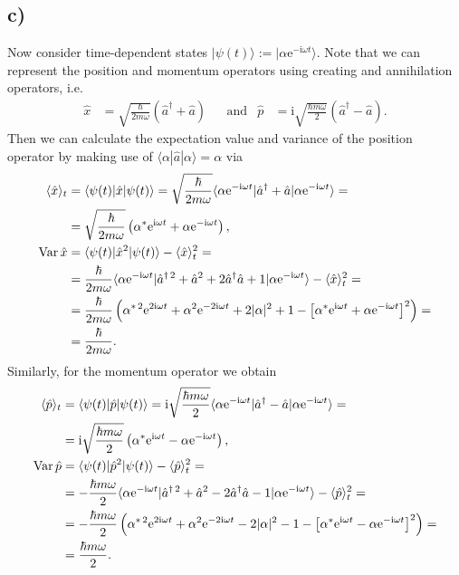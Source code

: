 \documentclass[english, parskip=full]{scrartcl}
\newcommand{\bra}{}
\newcommand{\braket}{}
\newcommand{\kla}{}
\newcommand{\klam}{}
\newcommand{\tecxt}{}
\newcommand{\Bra}{}
\newcommand{\Ket}{}
\renewcommand{\i}{\text{i}}
\newcommand{\e}{\text{e}}
\begin{document}
\subsection*{c)}
Now consider time-dependent states $\Ket | \psi(t) \rangle:=\Ket | \alpha\e^{-\i\omega t} \rangle$.
Note that we can represent the position and momentum operators using creating and annihilation operators, i.e.
\begin{align}
\hat{x} &= \sqrt{\frac{\hbar}{2m\omega}}\kla\left( \hat{a}^\dagger +\hat{a} \right)&&\tecxt\text{and}& \hat{p}&=\i\sqrt{\frac{\hbar m\omega}{2}}\kla\left( \hat{a}^\dagger -\hat{a} \right).
\end{align}
Then we can calculate the expectation value and variance of the position operator by making use of $\Bra\langle \alpha |\hat{a}\Ket | \alpha \rangle=\alpha$ via
\begin{align}
\bra\langle \hat{x} \rangle_t&=\braket\langle \psi(t) | \hat{x} | \psi(t) \rangle = \sqrt{\frac{\hbar}{2m\omega}}\braket\langle \alpha\e^{-\i\omega t} | \hat{a}^\dagger + \hat{a} | \alpha\e^{-\i\omega t} \rangle = \\
&= \sqrt{\frac{\hbar}{2m\omega}}\kla\left( \alpha^\ast\e^{\i\omega t} + \alpha\e^{-\i\omega t} \right),\\
\tecxt\text{Var\,} \hat{x} &=\braket\langle \psi(t) | \hat{x}^2 | \psi(t) \rangle - \bra\langle \hat{x} \rangle_t^2 = \\
&= \frac{\hbar}{2m\omega}\braket\langle \alpha\e^{-\i\omega t} | \hat{a}^{\dagger\,2} + \hat{a}^2 +2 \hat{a}^\dagger\hat{a} + 1 | \alpha\e^{-\i\omega t} \rangle - \bra\langle \hat{x} \rangle_t^2 =\\
&= \frac{\hbar}{2m\omega}\kla\left( \alpha^{\ast\,2}\e^{2\i\omega t} + \alpha^2\e^{-2\i\omega t} + 2|\alpha|^2+1-\klam\left[ \alpha^\ast\e^{\i\omega t} + \alpha\e^{-\i\omega t} \right]^2 \right) = \\
&=\frac{\hbar}{2 m\omega}.
\end{align}
Similarly, for the momentum operator we obtain
\begin{align}
\bra\langle \hat{p} \rangle_t&=\braket\langle \psi(t) | \hat{p} | \psi(t) \rangle = \i\sqrt{\frac{\hbar m\omega}{2}}\braket\langle \alpha\e^{-\i\omega t} | \hat{a}^\dagger - \hat{a} | \alpha\e^{-\i\omega t} \rangle = \\
&= \i\sqrt{\frac{\hbar m\omega}{2}}\kla\left( \alpha^\ast\e^{\i\omega t} - \alpha\e^{-\i\omega t} \right),\\
\tecxt\text{Var\,} \hat{p} &=\braket\langle \psi(t) | \hat{p}^2 | \psi(t) \rangle - \bra\langle \hat{p} \rangle_t^2 = \\
&= -\frac{\hbar m\omega}{2}\braket\langle \alpha\e^{-\i\omega t} | \hat{a}^{\dagger\,2} + \hat{a}^2 -2 \hat{a}^\dagger\hat{a} - 1 | \alpha\e^{-\i\omega t} \rangle - \bra\langle \hat{p} \rangle_t^2 =\\
&= -\frac{\hbar m\omega}{2}\kla\left( \alpha^{\ast\,2}\e^{2\i\omega t} + \alpha^2\e^{-2\i\omega t} - 2|\alpha|^2-1-\klam\left[ \alpha^\ast\e^{\i\omega t} - \alpha\e^{-\i\omega t} \right]^2 \right) = \\
&=\frac{\hbar m\omega}{2}.
\end{align}
\end{document}
